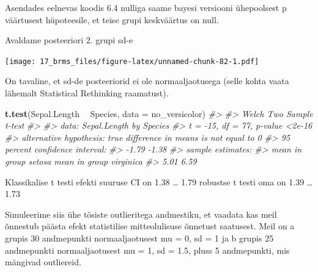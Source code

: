 \documentclass[]{book}
\newenvironment{Shaded}{\begin{snugshade}}{\end{snugshade}}
\newcommand{\CommentTok}[1]{\textcolor[rgb]{0.56,0.35,0.01}{\textit{#1}}}
\newcommand{\DataTypeTok}[1]{\textcolor[rgb]{0.13,0.29,0.53}{#1}}
\newcommand{\DecValTok}[1]{\textcolor[rgb]{0.00,0.00,0.81}{#1}}
\newcommand{\FloatTok}[1]{\textcolor[rgb]{0.00,0.00,0.81}{#1}}
\newcommand{\KeywordTok}[1]{\textcolor[rgb]{0.13,0.29,0.53}{\textbf{#1}}}
\newcommand{\NormalTok}[1]{#1}
\newcommand{\OperatorTok}[1]{\textcolor[rgb]{0.81,0.36,0.00}{\textbf{#1}}}
\newcommand{\OtherTok}[1]{\textcolor[rgb]{0.56,0.35,0.01}{#1}}
\newcommand{\StringTok}[1]{\textcolor[rgb]{0.31,0.60,0.02}{#1}}
\begin{document}
Asendades eelnevas koodis 6.4 nulliga saame bayesi versiooni ühepoolsest p väärtusest hüpoteesile, et teise grupi keskväärtus on null.

Avaldame posteeriori 2. grupi sd-e

\begin{Shaded}
\end{Shaded}

\texttt{[image: 17\_brms\_files/figure-latex/unnamed-chunk-82-1.pdf]}

On tavaline, et sd-de posteeriorid ei ole normaaljaotusega (selle kohta vaata lähemalt Statistical Rethinking raamatust).

\begin{Shaded}
\begin{Highlighting}[]
\KeywordTok{t.test}\NormalTok{(Sepal.Length }\OperatorTok{~}\StringTok{ }\NormalTok{Species, }\DataTypeTok{data =}\NormalTok{ no_versicolor)}
\CommentTok{#> }
\CommentTok{#>  Welch Two Sample t-test}
\CommentTok{#> }
\CommentTok{#> data:  Sepal.Length by Species}
\CommentTok{#> t = -15, df = 77, p-value <2e-16}
\CommentTok{#> alternative hypothesis: true difference in means is not equal to 0}
\CommentTok{#> 95 percent confidence interval:}
\CommentTok{#>  -1.79 -1.38}
\CommentTok{#> sample estimates:}
\CommentTok{#>    mean in group setosa mean in group virginica }
\CommentTok{#>                    5.01                    6.59}
\end{Highlighting}
\end{Shaded}

Klassikalise t testi efekti suuruse CI on 1.38 \ldots{} 1.79
robustse t testi oma on 1.39 \ldots{} 1.73

Simuleerime siis ühe tõsiste outlieritega andmestiku, et vaadata kas meil õnnestub päästa efekt statistilise mitteolulisuse õnnetust saatusest. Meil on a grupis 30 andmepunkti normaaljaotusest mu = 0, sd = 1 ja b grupis 25 andmepunkti normaaljaotusest mu = 1, sd = 1.5, pluss 5 andmepunkti, mis mängivad outliereid.
\end{document}
